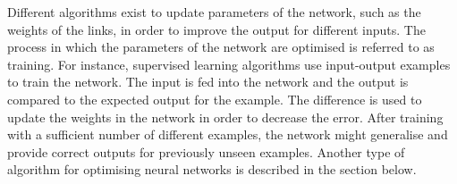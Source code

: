 Different algorithms exist to update parameters of the network, such as the weights of the
links, in order to improve the output for different inputs. The process in which the parameters of
the network are optimised is referred to as training. For instance, supervised learning algorithms use input-output
examples to train the network. The input is fed into the network and the output is compared
to the expected output for the example. The difference is used to update the weights in the network in order to decrease
the error. After training with a sufficient number of different examples, the network might generalise and provide
correct outputs for previously unseen examples. Another type of algorithm for optimising neural networks is described
in the section below.
